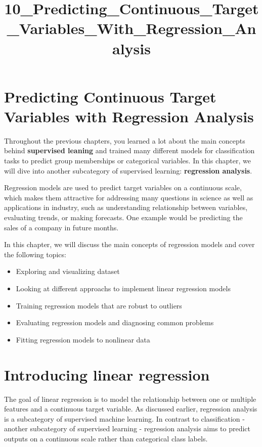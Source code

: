 \documentclass[11pt]{article}
\title{10\_Predicting\_Continuous\_Target\_Variables\_With\_Regression\_Analysis}
\providecommand{\tightlist}{%
      \setlength{\itemsep}{0pt}\setlength{\parskip}{0pt}}
\begin{document}
    
    
    \maketitle
    
    

    
    \section{Predicting Continuous Target Variables with Regression
Analysis}\label{predicting-continuous-target-variables-with-regression-analysis}

    Throughout the previous chapters, you learned a lot about the main
concepts behind \textbf{supervised leaning} and trained many different
models for classification tasks to predict group memberships or
categorical variables. In this chapter, we will dive into another
subcategory of supervised learning: \textbf{regression analysis}.

Regression models are used to predict target variables on a continuous
scale, which makes them attractive for addressing many questions in
science as well as applications in industry, such as understanding
relationship between variables, evaluating trends, or making forecasts.
One example would be predicting the sales of a company in future months.

In this chapter, we will discuss the main concepts of regression models
and cover the following topics:

\begin{itemize}
\tightlist
\item
  Exploring and visualizing dataset
\item
  Looking at different approachs to implement linear regression models
\item
  Training regression models that are robust to outliers
\item
  Evaluating regression models and diagnosing common problems
\item
  Fitting regression models to nonlinear data
\end{itemize}

    \section{Introducing linear
regression}\label{introducing-linear-regression}

    The goal of linear regression is to model the relationship between one
or multiple features and a continuous target variable. As discussed
earlier, regression analysis is a subcategory of supervised machine
learning. In contrast to classification - another subcategory of
supervised learning - regression analysis aims to predict outputs on a
continuous scale rather than categorical class labels.
\end{document}
